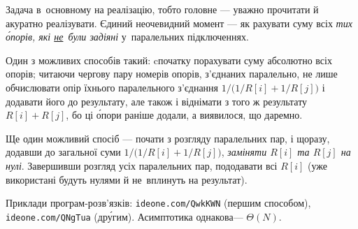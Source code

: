 \Tutorial	Задача в~основному на реалізацію, тобто головне --- уважно прочитати й акуратно реалізувати.
Єдиний неочевидний момент --- як рахувати суму всіх \emph{тих \'{о}порів, які \underline{не}~були задіяні} у~паралельних підключеннях.

Один з можливих способів такий: cпочатку порахувати суму абсолютно всіх опорів; читаючи чергову пару номерів опорів, з’єднаних паралельно, не лише обчислювати опір їхнього паралельного з’єднання $1/\bigl(1/R[i]+1/R[j]\bigr)$ і додавати його до результату, але також і віднімати з того ж результату $R[i]+R[j]$, бо ці \'{о}пори раніше додали, а виявилося, що даремно.

Ще один можливий спосіб --- почати з розгляду паралельних пар, і щоразу, додавши до загальної суми $1/\bigl(1/R[i]+1/R[j]\bigr)$, \emph{заміняти $R[i]$ та $R[j]$ на нулі}. Завершивши розгляд усіх паралельних пар, пододавати всі $R[i]$ (уже використані будуть нулями й не~вплинуть на результат).

Приклади програм-розв’язків: \verb"ideone.com/QwkKWN" (першим способом), \verb"ideone.com/QNgTua" (др\'{у}гим). Асимптотика однакова\nolinebreak[3] --- $\Theta(N)$.
